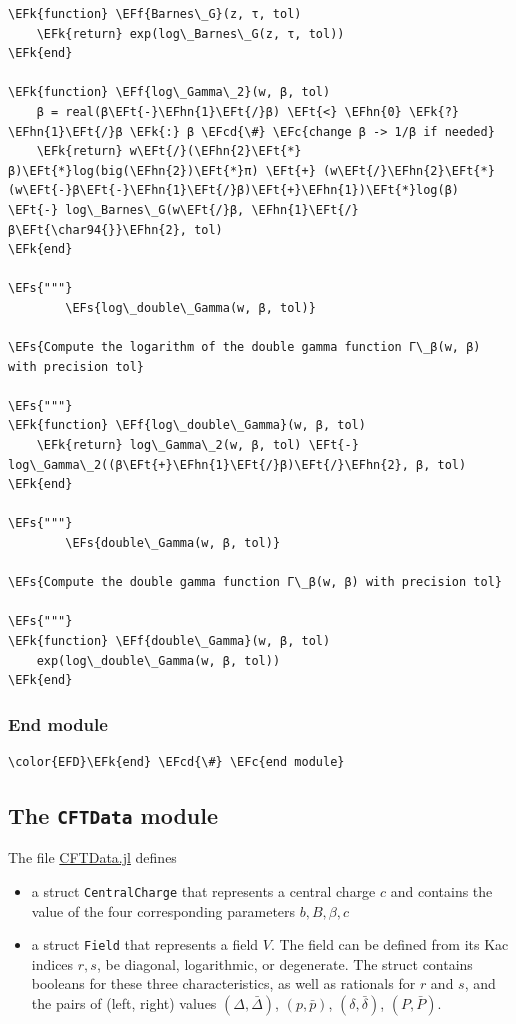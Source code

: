 \documentclass[a4paper]{article}
\numberwithin{equation}{section}
\newcommand{\EFc}[1]{\textcolor{EFc}{#1}} %
\newcommand{\EFcd}[1]{\textcolor{EFcd}{#1}} %
\newcommand{\EFs}[1]{\textcolor{EFs}{#1}} %
\newcommand{\EFk}[1]{\textcolor{EFk}{#1}} %
\newcommand{\EFf}[1]{\textcolor{EFf}{#1}} %
\newcommand{\EFt}[1]{\textcolor{EFt}{#1}} %
\newcommand{\EFhn}[1]{\textcolor{EFhn}{#1}} %
\begin{document}
\begin{Code}
\begin{Verbatim}
\EFk{function} \EFf{Barnes\_G}(z, τ, tol)
    \EFk{return} exp(log\_Barnes\_G(z, τ, tol))
\EFk{end}

\EFk{function} \EFf{log\_Gamma\_2}(w, β, tol)
    β = real(β\EFt{-}\EFhn{1}\EFt{/}β) \EFt{<} \EFhn{0} \EFk{?} \EFhn{1}\EFt{/}β \EFk{:} β \EFcd{\#} \EFc{change β -> 1/β if needed}
    \EFk{return} w\EFt{/}(\EFhn{2}\EFt{*}β)\EFt{*}log(big(\EFhn{2})\EFt{*}π) \EFt{+} (w\EFt{/}\EFhn{2}\EFt{*}(w\EFt{-}β\EFt{-}\EFhn{1}\EFt{/}β)\EFt{+}\EFhn{1})\EFt{*}log(β) \EFt{-} log\_Barnes\_G(w\EFt{/}β, \EFhn{1}\EFt{/}β\EFt{\char94{}}\EFhn{2}, tol)
\EFk{end}

\EFs{"""}
        \EFs{log\_double\_Gamma(w, β, tol)}

\EFs{Compute the logarithm of the double gamma function Γ\_β(w, β) with precision tol}

\EFs{"""}
\EFk{function} \EFf{log\_double\_Gamma}(w, β, tol)
    \EFk{return} log\_Gamma\_2(w, β, tol) \EFt{-} log\_Gamma\_2((β\EFt{+}\EFhn{1}\EFt{/}β)\EFt{/}\EFhn{2}, β, tol)
\EFk{end}

\EFs{"""}
        \EFs{double\_Gamma(w, β, tol)}

\EFs{Compute the double gamma function Γ\_β(w, β) with precision tol}

\EFs{"""}
\EFk{function} \EFf{double\_Gamma}(w, β, tol)
    exp(log\_double\_Gamma(w, β, tol))
\EFk{end}
\end{Verbatim}
\end{Code}
\subsubsection*{End module}
\label{sec:org4a773f4}

\begin{Code}
\begin{Verbatim}
\color{EFD}\EFk{end} \EFcd{\#} \EFc{end module}
\end{Verbatim}
\end{Code}
\subsection{The \texttt{CFTData} module}
\label{sec:orge424e13}
The file \href{src/CFTData.jl}{CFTData.jl} defines
\begin{itemize}
\item a struct \texttt{CentralCharge} that represents a central charge \(c\) and contains the value of the four corresponding parameters \(b, B, \beta, c\)
\item a struct \texttt{Field} that represents a field \(V\). The field can be defined from its Kac indices \(r, s\), be diagonal, logarithmic, or degenerate. The struct contains booleans for these three characteristics, as well as rationals for \(r\) and \(s\), and the pairs of (left, right) values \((\Delta, \bar \Delta)\), \((p, \bar p)\), \((\delta, \bar \delta)\), \((P, \bar P)\).
\end{itemize}
\end{document}
